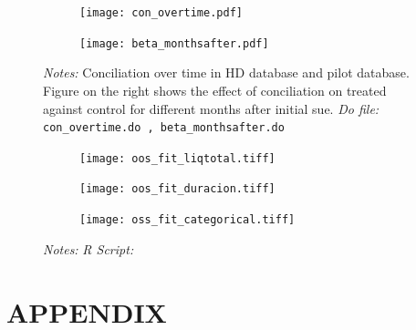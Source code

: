 \documentclass[11pt]{article}
\begin{document}
      
\begin{figure}[H]
    \caption{Conciliation over time}
    \label{Figure_dynamicsConciliation}
    \begin{center}
    \begin{subfigure}{0.49\textwidth}
    \centering
        \texttt{[image: con\_overtime.pdf]}
     \end{subfigure}
        \begin{subfigure}{0.49\textwidth}    
         \centering
        \texttt{[image: beta\_monthsafter.pdf]}
     \end{subfigure}
        \end{center}
        {\footnotesize \textit{Notes: } Conciliation over time in HD database and pilot database. Figure on the right shows the effect of conciliation on treated against control for different months after initial sue.}
        {\footnotesize \textit{Do file: } \texttt{con\_overtime.do , beta\_monthsafter.do}}
\end{figure}


\begin{figure}[H]
    \caption{ }
    \label{}
    \begin{center}
    \begin{subfigure}{0.49\textwidth}
    \centering
        \texttt{[image: oos\_fit\_liqtotal.tiff]}
     \end{subfigure}
     
        \begin{subfigure}{0.49\textwidth}    
         \centering
        \texttt{[image: oos\_fit\_duracion.tiff]}
     \end{subfigure}
     
     \begin{subfigure}{0.49\textwidth}
    \centering
        \texttt{[image: oss\_fit\_categorical.tiff]}
     \end{subfigure}
     
        \end{center}
        {\footnotesize \textit{Notes: } }
        {\footnotesize \textit{R Script: } \texttt{}}
\end{figure}



\section{APPENDIX}
\end{document}
